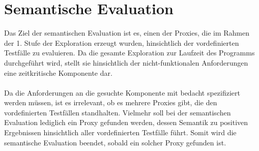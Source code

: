 

\section{Semantische Evaluation}
Das Ziel der semantischen Evaluation ist es, einen der Proxies, die im Rahmen der 1. Stufe der Exploration erzeugt wurden, hinsichtlich der vordefinierten Testfälle zu evaluieren. Da die gesamte Exploration zur Laufzeit des Programms durchgeführt wird, stellt sie hinsichtlich der nicht-funktionalen Anforderungen eine zeitkritische Komponente dar.
\\\\
Da die Anforderungen an die gesuchte Komponente mit bedacht spezifiziert werden müssen, ist es irrelevant, ob es mehrere Proxies gibt, die den vordefinierten Testfällen standhalten. Vielmehr soll bei der semantischen Evaluation lediglich ein Proxy gefunden werden, dessen Semantik zu positiven Ergebnissen hinsichtlich aller vordefinierten Testfälle führt. Somit wird die semantische Evaluation beendet, sobald ein solcher Proxy gefunden ist.

